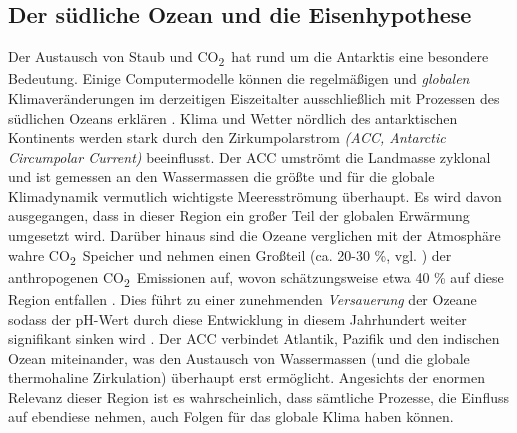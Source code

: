 \documentclass[12pt,a4paper,onecolumn]{scrartcl}
\newcommand{\cotwo}{CO\textsubscript{2}}
\begin{document}
\subsection{Der südliche Ozean und die Eisenhypothese} \label{sec:Eisenhypothese}
Der Austausch von Staub und \cotwo \ hat rund um die Antarktis eine besondere Bedeutung. Einige Computermodelle können die regelmäßigen und \textit{globalen} Klimaveränderungen im derzeitigen Eiszeitalter ausschließlich mit Prozessen des südlichen Ozeans erklären \citep{Fischer.2010}. Klima und Wetter nördlich des antarktischen Kontinents werden stark durch den Zirkumpolarstrom \textit{(ACC, Antarctic Circumpolar Current)} beeinflusst. Der ACC umströmt die Landmasse zyklonal und ist gemessen an den Wassermassen die größte und für die globale Klimadynamik vermutlich wichtigste Meeresströmung überhaupt. Es wird davon ausgegangen, dass in dieser Region ein großer Teil der globalen Erwärmung umgesetzt wird. Darüber hinaus sind die Ozeane verglichen mit der Atmosphäre wahre \cotwo \ Speicher und nehmen einen Großteil (ca. 20-30 \%, vgl. \citep{IPCCpol.2019}) der anthropogenen \cotwo \ Emissionen auf, wovon schätzungsweise etwa 40 \% auf diese Region entfallen \citep{Boning.2008}. Dies führt zu einer zunehmenden \textit{Versauerung} der Ozeane sodass der pH-Wert durch diese Entwicklung in diesem Jahrhundert weiter signifikant sinken wird \citep{IPCCpol.2019}. Der ACC verbindet Atlantik, Pazifik und den indischen Ozean miteinander, was den Austausch von Wassermassen (und die globale thermohaline Zirkulation) überhaupt erst ermöglicht. Angesichts der enormen Relevanz dieser Region ist es wahrscheinlich, dass sämtliche Prozesse, die Einfluss auf ebendiese nehmen, auch Folgen für das globale Klima haben können. \\
\end{document}
